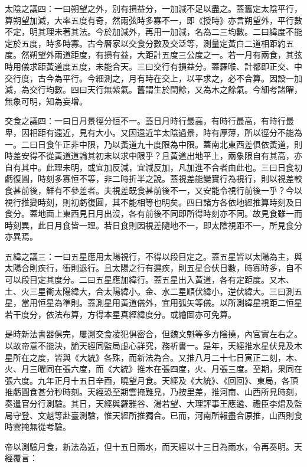 太陰之議四：一曰朔望之外，別有損益分，一加減不足以盡之。蓋舊定太陰平行，算朔望加減，大率五度有奇，然兩弦時多寡不一，即《授時》亦言朔望外，平行數不定，明其理未著其法。今於加減外，再用一加減，名為二三均數。二曰緯度不能定於五度，時多時寡。古今曆家以交食分數及交泛等，測量定黃白二道相距約五度。然朔望外兩道距度，有損有益，大距計五度三公度之一。若一月有兩食，其弦時用儀求距黃道度五度，未能合天。三曰交行有損益分。蓋羅喉、計都即正交、中交行度，古今為平行。今細測之，月有時在交上，以平求之，必不合算。因設一加減，為交行均數。四曰天行無紫氣。舊謂生於閏餘，又為木之餘氣。今細考諸曜，無象可明，知為妄增。

交食之議四：一曰日月景徑分恒不一。蓋日月時行最高，有時行最高，有時行最卑，因相距有遠近，見有大小。又因遠近竿太陰過景，時有厚薄，所以徑分不能為一。二曰日食午正非中限，乃以黃道九十度限為中限。蓋南北東西差俱依黃道，則時差安得不從黃道道論其初末以求中限乎？且黃道出地平上，兩象限自有其高，亦自有其中。此理未明，或宜加反減，宜減反加，凡加進不合者由此也。三曰日食初虧復圓，時刻多寡恒不等，非二時折半之說。蓋視差能變實行為視行，則以視差較食甚前後，鮮有不參差者。夫視差既食甚前後不一，又安能令視行前後一乎？今以視行推變時刻，則初虧復圓，其不能相等也明矣。四曰諸方各依地經推算時刻及日食分。蓋地面上東西見日月出沒，各有前後不同即所得時刻亦不同。故見食雖一而時刻異，此日月食皆一理。若日食則因視差隨地不一，即太陰視距不一，所見食分亦異焉。

五緯之議三：一曰五星應用太陽視行，不得以段目定之。蓋五星皆以太陽為主，與太陽合則疾行，衝則退行。且太陽之行有遲疾，則五星合伏日數，時寡時多，自不可以段目定其度分。二曰五星應加緯行。蓋五星出入黃道，各有定距度。又木、土、火三星衝太陽緯大，合太陽緯小。金、水二星順伏緯小，逆伏緯大。三曰測五星，當用恒星為準則。蓋測星用黃道儀外，宜用弧矢等儀。以所測緯星視距二恒星若干度分，依法布算，方得本星真經緯度分。或繪圖亦可免算。

是時新法書器俱完，屢測交食凌犯俱密合，但魏文魁等多方陰撓，內官實左右之。以故帝意不能決，諭天經同監局虛心詳究，務祈書一。是年，天經推水星伏見及木星所在之度，皆與《大統》各殊，而新法為合。又推八月二十七日寅正二刻，木、火、月三曜同在張六度，而《大統》推木在張四度，火、月張三度。至期，果同在張六度。九年正月十五日辛酉，曉望月食。天經及《大統》、《回回》、東局，各頂推虧圓食甚分秒時刻。天經恐至期雲掩難見，乃按里差，推河南、山西所見時刻，奏遣官分行測驗。其日，天經與羅雅谷、湯若望、大理評事王應遴、禮臣李焻及監局守登、文魁等赴臺測驗，惟天經所推獨合。已而，河南所報盡合原推，山西則食時雲掩無從考驗。

帝以測驗月食，新法為近，但十五日雨水，而天經以十三日為雨水，令再奏明。天經覆言：

